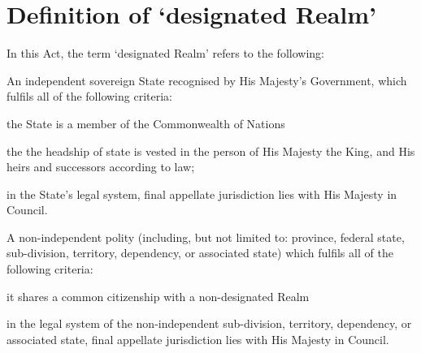 \documentclass{ukbill}
\begin{document}
\section{Definition of `designated Realm'}
\begin{numstat}
	\item In this Act, the term `designated Realm' refers to the following:
	\begin{alphstat}\item An independent sovereign State recognised by His Majesty's Government, which fulfils all of the following criteria:
\begin{romstat}
\item the State is a member of the Commonwealth of Nations
\item the the headship of state is vested in the person of His Majesty the King, and His heirs and successors according to law;
\item in the State's legal system, final appellate jurisdiction lies with His Majesty in Council.
  \end{romstat}
\item  A non-independent polity (including, but not limited to: province, federal state, sub-division, territory, dependency, or associated state) which fulfils all of the following criteria:
 \begin{romstat}
 	\item it shares a common citizenship with a non-designated Realm
 	\item in the legal system of the non-independent sub-division, territory, dependency, or associated state, final appellate jurisdiction lies with His Majesty in Council.
 	\end{romstat}
  		
  	\end{alphstat}
 
  \end{numstat}
\end{document}
